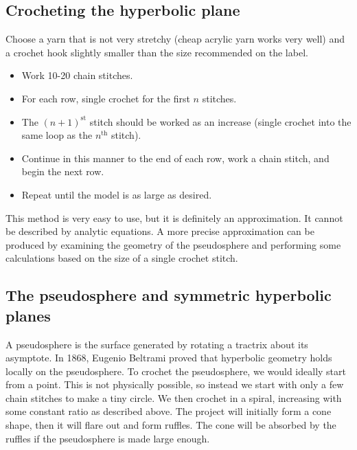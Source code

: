 \documentclass[letterpaper,titlepage]{article}
\begin{document}
\subsection{Crocheting the hyperbolic plane}
Choose a yarn that is not very stretchy (cheap acrylic yarn works very well) and a crochet hook slightly smaller than the size recommended on the label.
\begin{itemize}
\item Work 10-20 chain stitches.
\item For each row, single crochet for the first $n$ stitches.
\item The $(n+1)^{\text{st}}$ stitch should be worked as an increase (single crochet into the same loop as the $n^{\text{th}}$ stitch).
\item Continue in this manner to the end of each row, work a chain stitch, and begin the next row.
\item Repeat until the model is as large as desired.
\end{itemize}
This method is very easy to use, but it is definitely an approximation.
It cannot be described by analytic equations.
A more precise approximation can be produced by examining the geometry of the pseudosphere and performing some calculations based on the size of a single crochet stitch.

\subsection{The pseudosphere and symmetric hyperbolic planes}
A pseudosphere is the surface generated by rotating a tractrix about its asymptote.
In 1868, Eugenio Beltrami proved that hyperbolic geometry holds locally on the pseudosphere.
To crochet the pseudosphere, we would ideally start from a point.
This is not physically possible, so instead we start with only a few chain stitches to make a tiny circle.
We then crochet in a spiral, increasing with some constant ratio as described above.
The project will initially form a cone shape, then it will flare out and form ruffles.
The cone will be absorbed by the ruffles if the pseudosphere is made large enough.
\end{document}
